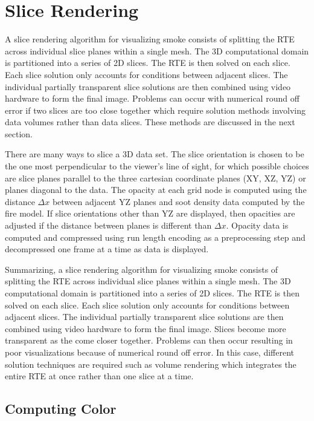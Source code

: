{\section{Slice Rendering}
A slice rendering algorithm for visualizing smoke consists of
splitting the RTE across individual slice planes within a single
mesh.  The 3D computational domain is partitioned into a series of
2D slices.  The RTE is then solved on each slice.  Each slice
solution only accounts for conditions between adjacent slices.
The individual partially transparent slice solutions are then
combined using video hardware to form the final image.   Problems
can occur with numerical round off error if two slices are too
close together which require solution methods  involving data
volumes rather than data slices. These methods are discussed in
the next section.

There are many ways to slice a 3D data set.  The slice orientation
is chosen to be the one most perpendicular to the viewer's line of
sight, for which possible choices are slice planes parallel to the
three cartesian coordinate planes (XY, XZ, YZ) or planes diagonal
to the data.  The opacity at each grid node is computed using the
distance $\Delta x$ between adjacent YZ planes and soot density
data computed by the fire model.  If slice orientations other than
YZ are displayed, then opacities are adjusted if the distance
between planes is different than $\Delta x$.  Opacity data is
computed and compressed using run length encoding as a
preprocessing step and decompressed one frame at a time as data is
displayed.


Summarizing, a slice rendering algorithm for visualizing smoke consists of
splitting the RTE across individual slice planes within a single
mesh.
The 3D computational domain is partitioned into a series of
2D slices.  The RTE is then solved on each slice.  Each slice
solution only accounts for conditions between adjacent slices.
The individual partially transparent slice solutions are then
combined using video hardware to form the final image.
Slices become more transparent as the come closer together. Problems
can then occur resulting in poor  visualizations because of numerical round off error.
In this case, different solution techniques are required such as volume rendering which integrates the entire RTE at once rather than one slice at a time.


\subsection{Computing Color}

}
